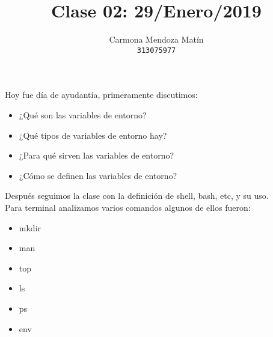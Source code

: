 \documentclass[11pt, a4paper]{report}
\begin{document}
\title{Clase 02: 29/Enero/2019}
\author{
  Carmona Mendoza Mat\'in\\
  \texttt{313075977}
}
\date{}
\maketitle

\newpage
Hoy fue d\'ia de ayudant\'ia, primeramente discutimos:
\begin{itemize}
\item ¿Qu\'e son las variables de entorno?
\item ¿Qu\'e tipos de variables de entorno hay?
\item ¿Para qu\'e sirven las variables de entorno?
\item ¿C\'omo se definen las variables de entorno?
\end{itemize}

Despu\'es seguimos la clase con la definici\'on de shell, bash, etc, y su uso. \\

Para terminal analizamos varios comandos algunos de ellos fueron:
\begin{itemize}
\item mkdir
\item man
\item top
\item ls
\item ps
\item env
\end{itemize}
  
\end{document}
